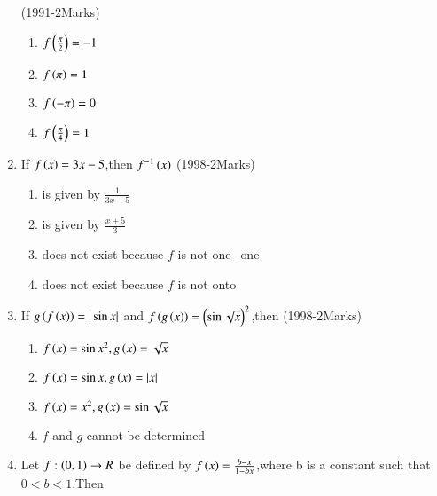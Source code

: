 \documentclass[journal,12pt,twocolumn]{IEEEtran}
\theoremstyle{remark}
\begin{document}
\begin{enumerate}[start=2]
\hfill(1991-2Marks)
\begin{multicols}{2}
\begin{enumerate} [label=(\alph*)]
\item $f\left(\frac{\pi}{2}\right)=-1$
\item $f\left(\pi\right)=1$
\item $f\left(-\pi\right)=0$
\item $f\left(\frac{\pi}{4}\right)=1$
\end{enumerate}
\end{multicols}
\item If $f\left(x\right)=3x-5$,then $f^{-1}\left(x\right)$
\hfill(1998-2Marks)
\begin{enumerate} [label=(\alph*)]
\item is given by $\frac{1}{3x-5}$
\item is given by $\frac{x+5}{3}$
\item does not exist because $f$ is not one$-$one
\item does not exist because $f$ is not onto 
\end{enumerate}
\item If $g\left(f\left(x\right)\right)=|\sin{x}|$ and $f\left(g\left(x\right)\right)=\left(\sin{\sqrt{x}}\right)^2$,then
\hfill(1998-2Marks)
\begin{enumerate} [label=(\alph*)]
\item $f\left(x\right)=\sin{x}^2,g\left(x\right)=\sqrt{x}$
\item $f\left(x\right)=\sin{x},g\left(x\right)=|x|$
\item $f\left(x\right)=x^2,g\left(x\right)=\sin{\sqrt{x}}$
\item $f$ and $g$ cannot be determined
\end{enumerate}
\item Let $f:\left(0,1\right)\rightarrow{R}$ be defined by $f\left(x\right)=\frac{b-x}{1-bx}$,where b is a constant such that $0<b<1$.Then


\end{enumerate}
\end{document}
